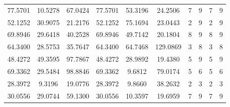 \documentclass[withoutpreface,bwprint]{cumcmthesis}
\begin{document}
\begin{appendices}
\begin{table}[htbp!]
\begin{tabular}{@{}cccccccccc@{}}
				77.5701                          & 10.5278                          & 67.0424                          & 77.5701                          & 53.3196                          & 24.2506                          & 7                    & 9                    & 7                      & 9                      \\
				52.1252                          & 30.9075                          & 21.2176                          & 52.1252                          & 75.1694                          & 23.0443                          & 2                    & 9                    & 2                      & 9                      \\
				69.8946                          & 29.6418                          & 40.2528                          & 69.8946                          & 49.7142                          & 20.1804                          & 8                    & 9                    & 8                      & 9                      \\
				64.3400                          & 28.5753                          & 35.7647                          & 64.3400                          & 64.7468                          & 129.0869                         & 3                    & 8                    & 3                      & 8                      \\
				48.4272                          & 49.3595                          & 97.7867                          & 48.4272                          & 28.9892                          & 19.4380                          & 5                    & 9                    & 5                      & 9                      \\
				69.3362                          & 29.5484                          & 98.8846                          & 69.3362                          & 9.6812                           & 79.0174                          & 5                    & 6                    & 5                      & 6                      \\
				28.3972                          & 9.3196                           & 19.0776                          & 28.3972                          & 9.8660                           & 38.2632                          & 2                    & 3                    & 2                      & 3                      \\
				30.0556                          & 29.0744                          & 59.1300                          & 30.0556                          & 10.3597                          & 19.6959                          & 7                    & 9                    & 7                      & 9                      \\

\end{tabular}
\end{table}
\end{appendices}
\end{document}
